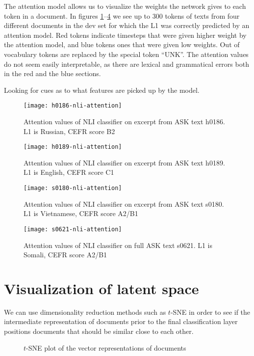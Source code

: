 The attention model allows us to visualize the weights the network gives to
each token in a document. In figures
\ref{fig:h0186-nli-attention}--\ref{fig:s0621-nli-attention} we see up to 300
tokens of texts from four different documents in the dev set for which the L1
was correctly predicted by an attention model. Red tokens indicate timesteps
that were given higher weight by the attention model, and blue tokens ones
that were given low weights. Out of vocabulary tokens are replaced by the
special token ``UNK''. The attention values do not seem easily interpretable,
as there are lexical and grammatical errors both in the red and the blue
sections.

Looking for cues as to what features are picked up by the model. 

\begin{figure}
  \centering
  \texttt{[image: h0186-nli-attention]}
  \caption{Attention values of NLI classifier on excerpt from ASK text h0186.
           L1 is Russian, CEFR score B2}
  \label{fig:h0186-nli-attention}
\end{figure}

\begin{figure}
  \centering
  \texttt{[image: h0189-nli-attention]}
  \caption{Attention values of NLI classifier on excerpt from ASK text h0189.
           L1 is English, CEFR score C1}
  \label{fig:h0189-nli-attention}
\end{figure}

\begin{figure}
  \centering
  \texttt{[image: s0180-nli-attention]}
  \caption{Attention values of NLI classifier on excerpt from ASK text s0180.
           L1 is Vietnamese, CEFR score A2/B1}
  \label{fig:s0180-nli-attention}
\end{figure}

\begin{figure}
  \centering
  \texttt{[image: s0621-nli-attention]}
  \caption{Attention values of NLI classifier on full ASK text s0621.
           L1 is Somali, CEFR score A2/B1}
  \label{fig:s0621-nli-attention}
\end{figure}


\section{Visualization of latent space}

We can use dimensionality reduction methods such as $t$-SNE in order to see
if the intermediate representation of documents prior to the final
classification layer positions documents that should be similar close to each
other.

\begin{figure}
  \centering
  \caption{$t$-SNE plot of the vector representations of documents}
  \label{fig:cefr-t-sne}
\end{figure}
